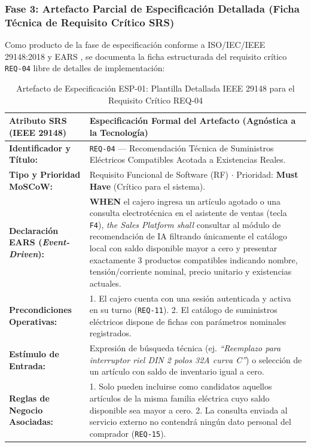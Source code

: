 \subsubsection{Fase 3: Artefacto Parcial de Especificación Detallada (Ficha Técnica de Requisito Crítico SRS)}
Como producto de la fase de especificación conforme a ISO/IEC/IEEE 29148:2018 \cite{ieee29148} y EARS \cite{mavin2009ears}, se documenta la ficha estructurada del requisito crítico \texttt{REQ-04} libre de detalles de implementación:
\begin{table}[htbp]
	\centering
	\scriptsize
	\caption{Artefacto de Especificación ESP-01: Plantilla Detallada IEEE 29148 para el Requisito Crítico REQ-04}
	\label{tab:artefacto_especificacion}
	\begin{tabularx}{\textwidth}{>{\raggedright\arraybackslash}p{} Y}
		\toprule
		\textbf{Atributo SRS (IEEE 29148)} & \textbf{Especificación Formal del Artefacto (Agnóstica a la Tecnología)} \\
		\midrule
		\textbf{Identificador y Título:} & \texttt{REQ-04} --- Recomendación Técnica de Suministros Eléctricos Compatibles Acotada a Existencias Reales. \\
		\textbf{Tipo y Prioridad MoSCoW:} & Requisito Funcional de Software (RF) $\cdot$ Prioridad: \textbf{Must Have} (Crítico para el sistema). \\
		\textbf{Declaración EARS (\textit{Event-Driven}):} & \textbf{WHEN} el cajero ingresa un artículo agotado o una consulta electrotécnica en el asistente de ventas (tecla \texttt{F4}), \textit{the Sales Platform shall} consultar al módulo de recomendación de IA filtrando únicamente el catálogo local con saldo disponible mayor a cero y presentar exactamente 3 productos compatibles indicando nombre, tensión/corriente nominal, precio unitario y existencias actuales. \\
		\textbf{Precondiciones Operativas:} & 1. El cajero cuenta con una sesión autenticada y activa en su turno (\texttt{REQ-11}). 2. El catálogo de suministros eléctricos dispone de fichas con parámetros nominales registrados. \\
		\textbf{Estímulo de Entrada:} & Expresión de búsqueda técnica (ej. \textit{``Reemplazo para interruptor riel DIN 2 polos 32A curva C''}) o selección de un artículo con saldo de inventario igual a cero. \\
		\textbf{Reglas de Negocio Asociadas:} & 1. Solo pueden incluirse como candidatos aquellos artículos de la misma familia eléctrica cuyo saldo disponible sea mayor a cero. 2. La consulta enviada al servicio externo no contendrá ningún dato personal del comprador (\texttt{REQ-15}). \\

\end{tabularx}
\end{table}
